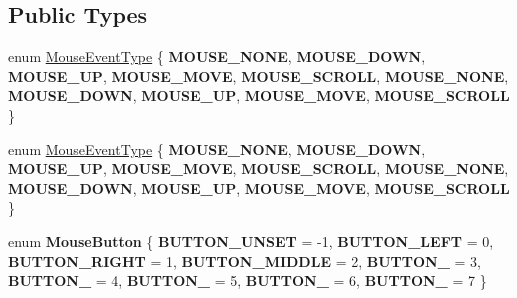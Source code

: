 \subsection*{Public Types}
\begin{DoxyCompactItemize}
\item 
enum \hyperlink{classEventMouse_a6a96ce5df8674cbaf01b74d2f17f213c}{Mouse\+Event\+Type} \{ \newline
{\bfseries M\+O\+U\+S\+E\+\_\+\+N\+O\+NE}, 
{\bfseries M\+O\+U\+S\+E\+\_\+\+D\+O\+WN}, 
{\bfseries M\+O\+U\+S\+E\+\_\+\+UP}, 
{\bfseries M\+O\+U\+S\+E\+\_\+\+M\+O\+VE}, 
\newline
{\bfseries M\+O\+U\+S\+E\+\_\+\+S\+C\+R\+O\+LL}, 
{\bfseries M\+O\+U\+S\+E\+\_\+\+N\+O\+NE}, 
{\bfseries M\+O\+U\+S\+E\+\_\+\+D\+O\+WN}, 
{\bfseries M\+O\+U\+S\+E\+\_\+\+UP}, 
\newline
{\bfseries M\+O\+U\+S\+E\+\_\+\+M\+O\+VE}, 
{\bfseries M\+O\+U\+S\+E\+\_\+\+S\+C\+R\+O\+LL}
 \}
\item 
enum \hyperlink{classEventMouse_a6a96ce5df8674cbaf01b74d2f17f213c}{Mouse\+Event\+Type} \{ \newline
{\bfseries M\+O\+U\+S\+E\+\_\+\+N\+O\+NE}, 
{\bfseries M\+O\+U\+S\+E\+\_\+\+D\+O\+WN}, 
{\bfseries M\+O\+U\+S\+E\+\_\+\+UP}, 
{\bfseries M\+O\+U\+S\+E\+\_\+\+M\+O\+VE}, 
\newline
{\bfseries M\+O\+U\+S\+E\+\_\+\+S\+C\+R\+O\+LL}, 
{\bfseries M\+O\+U\+S\+E\+\_\+\+N\+O\+NE}, 
{\bfseries M\+O\+U\+S\+E\+\_\+\+D\+O\+WN}, 
{\bfseries M\+O\+U\+S\+E\+\_\+\+UP}, 
\newline
{\bfseries M\+O\+U\+S\+E\+\_\+\+M\+O\+VE}, 
{\bfseries M\+O\+U\+S\+E\+\_\+\+S\+C\+R\+O\+LL}
 \}
\item 
\mbox{\label{classEventMouse_a4bb95bded5aeec88af37ab8a0c32e9e4}} 
enum {\bfseries Mouse\+Button} \{ \newline
{\bfseries B\+U\+T\+T\+O\+N\+\_\+\+U\+N\+S\+ET} = -\/1, 
{\bfseries B\+U\+T\+T\+O\+N\+\_\+\+L\+E\+FT} = 0, 
{\bfseries B\+U\+T\+T\+O\+N\+\_\+\+R\+I\+G\+HT} = 1, 
{\bfseries B\+U\+T\+T\+O\+N\+\_\+\+M\+I\+D\+D\+LE} = 2, 
\newline
{\bfseries B\+U\+T\+T\+O\+N\+\_} = 3, 
{\bfseries B\+U\+T\+T\+O\+N\+\_} = 4, 
{\bfseries B\+U\+T\+T\+O\+N\+\_} = 5, 
{\bfseries B\+U\+T\+T\+O\+N\+\_} = 6, 
\newline
{\bfseries B\+U\+T\+T\+O\+N\+\_} = 7
 \}
\end{DoxyCompactItemize}
